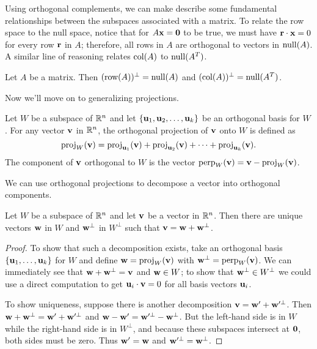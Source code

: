 \documentclass[../m073main.tex]{subfiles}
\begin{document}
Using orthogonal complements, we can make describe some fundamental relationships between the subspaces associated with a matrix.
To relate the row space to the null space, notice that for $A \mathbf{x} = \mathbf{0}$ to be true, we must have $\mathbf{r} \cdot \mathbf{x} = 0$ for every row $\mathbf{r}$ in $A$; therefore, all rows in $A$ are orthogonal to vectors in $\textrm{null}(A)$.
A similar line of reasoning relates $\textrm{col}(A)$ to $\textrm{null}(A^T)$. 

\begin{theorem}
	Let $A$ be a matrix.
	Then $(\textrm{row}(A))^\perp = \textrm{null}(A)$ and $(\textrm{col}(A))^\perp = \textrm{null}(A^T)$.
\end{theorem}

Now we'll move on to generalizing projections.

\begin{definition}
	Let $W$ be a subspace of $\mathbb{R}^n$ and let $\{\mathbf{u}_1, \mathbf{u}_2, \ldots, \mathbf{u}_k\}$ be an orthogonal basis for $W$.
	For any vector $\mathbf{v}$ in $\mathbb{R}^n$, the orthogonal projection of $\mathbf{v}$ onto $W$ is defined as
	\[ \textrm{proj}_W(\mathbf{v}) = \textrm{proj}_{\mathbf{u}_1}(\mathbf{v}) + \textrm{proj}_{\mathbf{u}_2}(\mathbf{v}) + \cdots + \textrm{proj}_{\mathbf{u}_k}(\mathbf{v}). \]
	The component of $\mathbf{v}$ orthogonal to $W$ is the vector $\textrm{perp}_W(\mathbf{v}) = \mathbf{v} - \textrm{proj}_W(\mathbf{v})$.
\end{definition}

We can use orthogonal projections to decompose a vector into orthogonal components.

\begin{theorem}
	Let $W$ be a subspace of $\mathbb{R}^n$ and let $\mathbf{v}$ be a vector in $\mathbb{R}^n$.
	Then there are unique vectors $\mathbf{w}$ in $W$ and $\mathbf{w}^\perp$ in $W^\perp$ such that $\mathbf{v} = \mathbf{w} + \mathbf{w}^\perp$.
\end{theorem}

\begin{proof}
	To show that such a decomposition exists, take an orthogonal basis $\left\{ \mathbf{u}_1, \ldots, \mathbf{u}_k \right\}$ for $W$ and define $\mathbf{w} = \textrm{proj}_W(\mathbf{v})$ with $\mathbf{w}^\perp = \textrm{perp}_W(\mathbf{v})$.
	We can immediately see that $\mathbf{w} + \mathbf{w}^\perp = \mathbf{v}$ and $\mathbf{w} \in W$; to show that $\mathbf{w}^\perp \in W^\perp$ we could use a direct computation to get $\mathbf{u}_i \cdot \mathbf{v} = 0$ for all basis vectors $\mathbf{u}_i$.

	To show uniqueness, suppose there is another decomposition $\mathbf{v} = \mathbf{w}' + \mathbf{w}'^\perp$.
	Then $\mathbf{w} + \mathbf{w}^\perp = \mathbf{w}' + \mathbf{w}'^\perp$ and $\mathbf{w} - \mathbf{w}' = \mathbf{w}'^\perp - \mathbf{w}^\perp$.
	But the left-hand side is in $W$ while the right-hand side is in $W^\perp$, and because these subspaces intersect at $\mathbf{0}$, both sides must be zero.
	Thus $\mathbf{w}' = \mathbf{w}$ and $\mathbf{w}'^\perp = \mathbf{w}^\perp$.
\end{proof}
\end{document}
